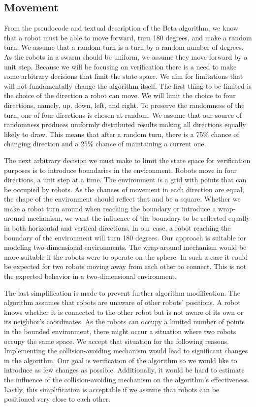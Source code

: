 \subsection{Movement}
From the pseudocode and textual description of the Beta algorithm, we know that a robot must be able to move forward, turn 180 degrees, and make a random turn. We assume that a random turn is a turn by a random number of degrees. As the robots in a swarm should be uniform, we assume they move forward by a unit step. Because we will be focusing on verification there is a need to make some arbitrary decisions that limit the state space. We aim for limitations that will not fundamentally change the algorithm itself. The first thing to be limited is the choice of the direction a robot can move. We will limit the choice to four directions, namely, up, down, left, and right. To preserve the randomness of the turn, one of four directions is chosen at random. We assume that our source of randomness produces uniformly distributed results making all directions equally likely to draw. This means that after a random turn, there is a 75\% chance of changing direction and a 25\% chance of maintaining a current one. 

The next arbitrary decision we must make to limit the state space for verification purposes is to introduce boundaries in the environment. Robots move in four directions, a unit step at a time. The environment is a grid with points that can be occupied by robots. As the chances of movement in each direction are equal, the shape of the environment should reflect that and be a square. Whether we make a robot turn around when reaching the boundary or introduce a wrap-around mechanism, we want the influence of the boundary to be reflected equally in both horizontal and vertical directions. In our case, a robot reaching the boundary of the environment will turn 180 degrees. Our approach is suitable for modeling two-dimensional environments. The wrap-around mechanism would be more suitable if the robots were to operate on the sphere. In such a case it could be expected for two robots moving away from each other to connect. This is not the expected behavior in a two-dimensional environment.

The last simplification is made to prevent further algorithm modification. The algorithm assumes that robots are unaware of other robots' positions. A robot knows whether it is connected to the other robot but is not aware of its own or its neighbor's coordinates. As the robots can occupy a limited number of points in the bounded environment, there might occur a situation where two robots occupy the same space. We accept that situation for the following reasons. Implementing the collision-avoiding mechanism would lead to significant changes in the algorithm. Our goal is verification of the algorithm so we would like to introduce as few changes as possible. Additionally, it would be hard to estimate the influence of the collision-avoiding mechanism on the algorithm's effectiveness. Lastly, this simplification is acceptable if we assume that robots can be positioned very close to each other.


